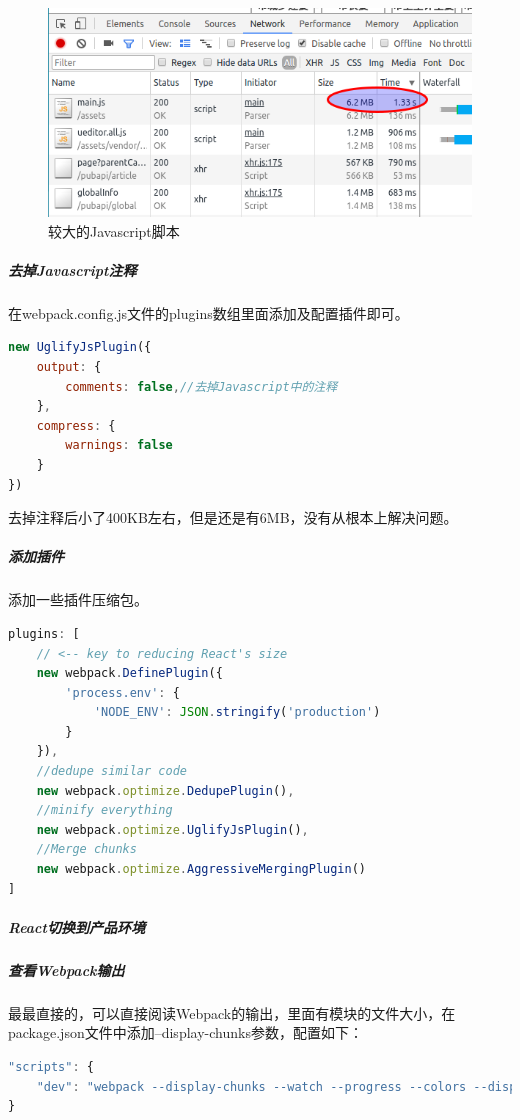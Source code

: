\documentclass[12pt]{book}
\numberwithin{dummy}{section}
\theoremstyle{ocrenumbox}
\theoremstyle{blacknumex}
\theoremstyle{blacknumbox}
\theoremstyle{ocrenum}
\begin{document}
\begin{figure}[htbp]
	\centering
	\includegraphics[scale=0.5]{largejavasript.png}
	\caption{较大的Javascript脚本}
	\label{fig:largejavasript}
\end{figure}

\subparagraph{去掉Javascript注释}

在webpack.config.js文件的plugins数组里面添加及配置插件即可。

\begin{lstlisting}[language=Javascript]
new UglifyJsPlugin({
	output: {
		comments: false,//去掉Javascript中的注释
	},
	compress: {
		warnings: false
	}
})
\end{lstlisting}

去掉注释后小了400KB左右，但是还是有6MB，没有从根本上解决问题。

\subparagraph{添加插件}

添加一些插件压缩包。

\begin{lstlisting}[language=Javascript]
plugins: [
	// <-- key to reducing React's size
	new webpack.DefinePlugin({ 
		'process.env': {
			'NODE_ENV': JSON.stringify('production')
		}
	}),
	//dedupe similar code
	new webpack.optimize.DedupePlugin(),
	//minify everything  
	new webpack.optimize.UglifyJsPlugin(), 
	//Merge chunks
	new webpack.optimize.AggressiveMergingPlugin() 
]
\end{lstlisting}


\subparagraph{React切换到产品环境}

\subparagraph{查看Webpack输出}

最最直接的，可以直接阅读Webpack的输出，里面有模块的文件大小，在package.json文件中添加--display-chunks参数，配置如下：

\begin{lstlisting}[language=Javascript]
"scripts": {
	"dev": "webpack --display-chunks --watch --progress --colors --display-error-details --config webpack/dev.config.js",
}
\end{lstlisting}
\end{document}
